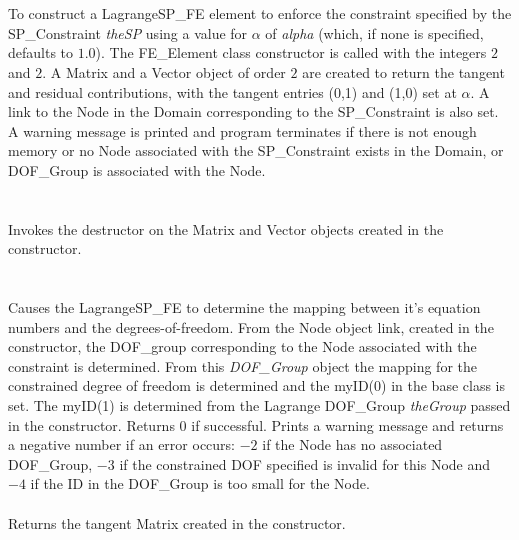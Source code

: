   \\
\\
To construct a LagrangeSP\_FE element to enforce the constraint
specified by the SP\_Constraint {\em theSP} using a value for
$\alpha$ of {\em alpha} (which, if none is specified, defaults to
$1.0$). The FE\_Element class constructor is called with 
the integers $2$ and $2$. A Matrix and a Vector object of order $2$
are created to return the tangent and residual contributions, with the
tangent entries (0,1) and (1,0) set at $\alpha$. A link to the Node in the Domain
corresponding to the SP\_Constraint is also set. A warning message is
printed and program terminates if there is not enough memory or no
Node associated with the SP\_Constraint exists in the Domain, or
DOF\_Group is associated with the Node.\\

  \\
  \\
Invokes the destructor on the Matrix and Vector objects created in the
constructor. \\

  \\
 \\
Causes the LagrangeSP\_FE to determine the mapping between it's equation
numbers and the degrees-of-freedom. From the Node object link, created
in the constructor, the DOF\_group corresponding to the Node
associated with the constraint is determined. From this {\em
DOF\_Group} object the mapping for the constrained degree of freedom
is determined and the myID(0) in the base class is set. The myID(1) is
determined from the Lagrange DOF\_Group {\em theGroup} passed in the
constructor. Returns $0$ if 
successful. Prints a warning message and returns a negative number if
an error occurs: $-2$ if the
Node has no associated DOF\_Group, $-3$ if the constrained DOF
specified is invalid for this Node and $-4$ if the ID in the
DOF\_Group is too small for the Node. \\ 

 \\
Returns the tangent Matrix created in the constructor. \\

